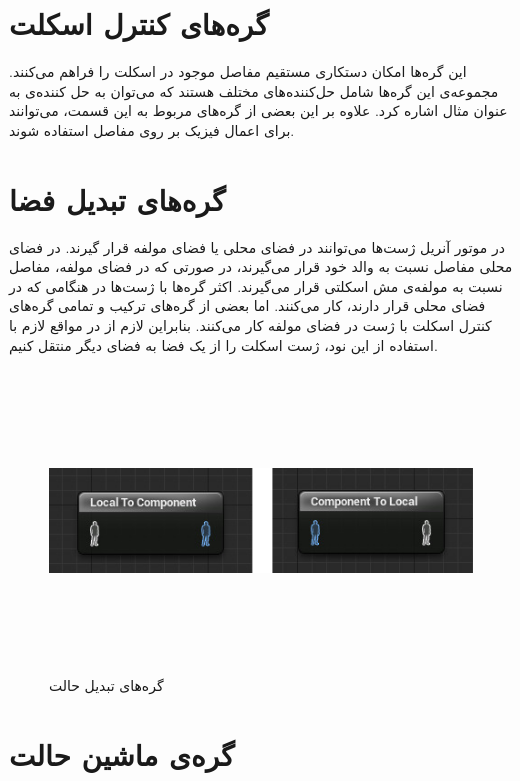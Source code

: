 \cite{BlendNodeUnrealEngine}


\section{گره‌های کنترل اسکلت}

این گره‌ها امکان دستکاری مستقیم مفاصل موجود در اسکلت را فراهم می‌کنند.
مجموعه‌ی این گره‌ها شامل حل‌کننده‌های مختلف هستند که می‌توان به 
حل کننده‌ی 
به عنوان مثال اشاره کرد.
علاوه بر این بعضی از گره‌های مربوط به این قسمت، می‌توانند برای اعمال فیزیک بر روی 
مفاصل استفاده شوند.
\cite{SkeletalControlsUnrealEngine}

\section{گره‌های تبدیل فضا}

در موتور آنریل ژست‌ها می‌توانند در فضای محلی یا فضای مولفه قرار گیرند.
در فضای محلی مفاصل نسبت به والد خود قرار می‌گیرند، در صورتی که 
در فضای مولفه، مفاصل نسبت به مولفه‌ی مش اسکلتی 
قرار می‌گیرند.
اکثر گره‌ها با ژست‌ها در هنگامی که در فضای محلی قرار دارند، کار می‌کنند.
اما بعضی از گره‌های ترکیب و تمامی گره‌های کنترل اسکلت 
با ژست در فضای مولفه کار می‌کنند. بنابراین لازم از در مواقع لازم با استفاده از 
این نود، ژست اسکلت را از یک فضا به فضای دیگر منتقل کنیم.
\cite{ChangeSpaceUnrealEngine}

\begin{figure}[ht]
	\centerline{\includegraphics[width=\textwidth,height=8cm,keepaspectratio]{Figures/Ch3/ChnageSpaceNodes.png}}\hfill
	\caption{ گره‌های تبدیل حالت }
	\label{fig:ChnageSpaceNodes}
\end{figure}

\section{گره‌‌ی ماشین حالت}

